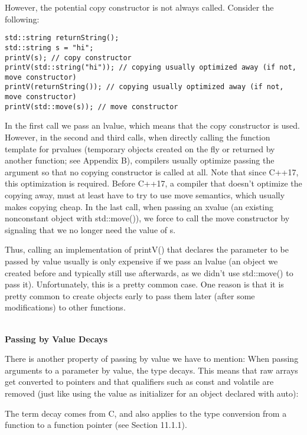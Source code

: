 However, the potential copy constructor is not always called. Consider the following:

\begin{lstlisting}[style=styleCXX]
std::string returnString();
std::string s = "hi";
printV(s); // copy constructor
printV(std::string("hi")); // copying usually optimized away (if not, move constructor)
printV(returnString()); // copying usually optimized away (if not, move constructor)
printV(std::move(s)); // move constructor
\end{lstlisting}

In the first call we pass an lvalue, which means that the copy constructor is used. However, in the second and third calls, when directly calling the function template for prvalues (temporary objects created on the fly or returned by another function; see Appendix B), compilers usually optimize passing the argument so that no copying constructor is called at all. Note that since C++17, this optimization is required. Before C++17, a compiler that doesn’t optimize the copying away, must at least have to try to use move semantics, which usually makes copying cheap. In the last call, when passing an xvalue (an existing nonconstant object with std::move()), we force to call the move constructor by signaling that we no longer need the value of s.

Thus, calling an implementation of printV() that declares the parameter to be passed by value usually is only expensive if we pass an lvalue (an object we created before and typically still use afterwards, as we didn’t use std::move() to pass it). Unfortunately, this is a pretty common case. One reason is that it is pretty common to create objects early to pass them later (after some modifications) to other functions.

\hspace*{\fill} \\ %
\noindent
\textbf{Passing by Value Decays}

There is another property of passing by value we have to mention: When passing arguments to a parameter by value, the type decays. This means that raw arrays get converted to pointers and that qualifiers such as const and volatile are removed (just like using the value as initializer for an object declared with auto):

\begin{tcolorbox}[colback=webgreen!5!white,colframe=webgreen!75!black]
\hspace*{0.75cm}The term decay comes from C, and also applies to the type conversion from a function to a function pointer (see Section 11.1.1).
\end{tcolorbox}

